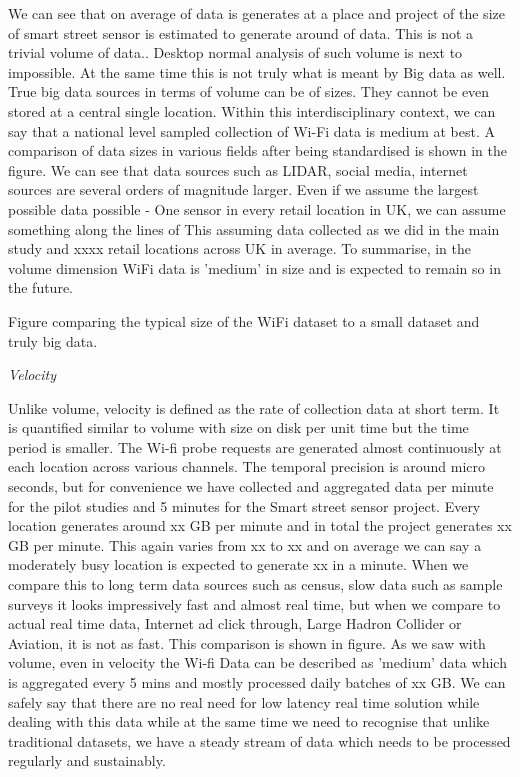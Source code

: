 We can see that on average  of data is generates at a place and project of the size of smart street sensor is estimated to generate around  of data.
This is not a trivial volume of data..
Desktop normal analysis of such volume is next to impossible.
At the same time this is not truly what is meant by Big data as well.
True big data sources in terms of volume can be of  sizes.
They cannot be even stored at a central single location.
Within this interdisciplinary context, we can say that a national level sampled collection of Wi-Fi data is medium at best.
A comparison of data sizes in various fields after being standardised is shown in the figure.
We can see that data sources such as LIDAR, social media, internet sources are several orders of magnitude larger.
Even if we assume the largest possible data possible - One sensor in every retail location in UK, we can assume something along the lines of  This assuming data collected as we did in the main study and xxxx retail locations across UK in average.
To summarise, in the volume dimension WiFi data is 'medium' in size and is expected to remain so in the future.

Figure comparing the typical size of the WiFi dataset to a small dataset and truly big data.

\textit{Velocity}

Unlike volume, velocity is defined as the rate of collection data at short term.
It is quantified similar to volume with size on disk per unit time but the time period is smaller.
The Wi-fi probe requests are generated almost continuously at each location across various channels.
The temporal precision is around micro seconds, but for convenience we have collected and aggregated data per minute for the pilot studies and 5 minutes for the Smart street sensor project.
Every location generates around xx GB per minute and in total the project generates xx GB per minute.
This again varies from xx to xx and on average we can say a moderately busy location is expected to generate xx in a minute.
When we compare this to long term data sources such as census, slow data such as sample surveys it looks impressively fast and almost real time, but when we compare to actual real time data, Internet ad click through, Large Hadron Collider or Aviation, it is not as fast.
This comparison is shown in figure.
As we saw with volume, even in velocity the Wi-fi Data can be described as 'medium' data which is aggregated every 5 mins and mostly processed daily batches of xx GB.
We can safely say that there are no real need for low latency real time solution while dealing with this data while at the same time we need to recognise that unlike traditional datasets, we have a steady stream of data which needs to be processed regularly and sustainably.

